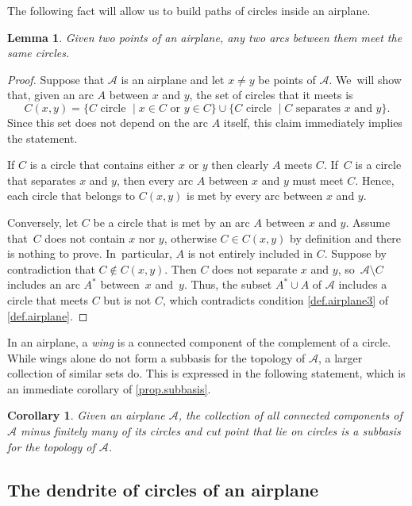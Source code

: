 \documentclass[JEP,XML,SOM,Unicode,NoFloatCountersInSection,published]{cedram}
\theoremstyle{plain}
\newtheorem{corollary}[theorem]{Corollary}
\newtheorem{lemma}[theorem]{Lemma}
\theoremstyle{definition}
\theoremstyle{remark}
\newcommand{\A}{\mathcal{A}}
\begin{document}
The following fact will allow us to build paths of circles inside an airplane.

\begin{lemma}
\label{lem.airplane.arcs}
Given two points of an airplane, any two arcs between them meet the same circles.
\end{lemma}

\begin{proof}
Suppose that $\A$ is an airplane and let $x \neq y$ be points of $\A$. We~will show that, given an arc $A$ between $x$ and $y$, the set of circles that it meets is
\[
 C(x,y) = \{ C \text{ circle } \mid x \in C \text{ or } y \in C \} \cup \{ C \text{ circle } \mid C \text{ separates } x \text{ and } y \}. 
\]
Since this set does not depend on the arc $A$ itself, this claim immediately implies the statement.

If $C$ is a circle that contains either $x$ or $y$ then clearly $A$ meets $C$. If~$C$ is a circle that separates $x$ and $y$, then every arc $A$ between $x$ and $y$ must meet $C$.
Hence, each circle that belongs to $C(x,y)$ is met by every arc between $x$ and $y$.

Conversely, let $C$ be a circle that is met by an arc $A$ between $x$ and $y$.
Assume that~$C$ does not contain $x$ nor $y$, otherwise $C \in C(x,y)$ by definition and there is nothing to prove. In~particular, $A$ is not entirely included in $C$.
Suppose by contradiction that $C \notin C(x,y)$.
Then $C$ does not separate $x$ and $y$, so~$\A \setminus C$ includes an arc $A^*$ between~$x$ and~$y$.
Thus, the subset $A^* \cup A$ of $\A$ includes a circle that meets $C$ but is not $C$, which contradicts condition \cref{def.airplane3} of \cref{def.airplane}.
\end{proof}

In an airplane, a \emph{wing} is a connected component of the complement of a circle.
While wings alone do not form a subbasis for the topology of $\A$, a larger collection of similar sets do.
This is expressed in the following statement, which is an immediate corollary of \cref{prop.subbasis}.

\begin{corollary}
Given an airplane $\A$, the collection of all connected components of $\A$ minus finitely many of its circles and cut point that lie on circles is a subbasis for the topology of $\A$.
\end{corollary}

\subsection{The dendrite of circles of an airplane}
\label{sub.dendrite.of.circles}
\end{document}

